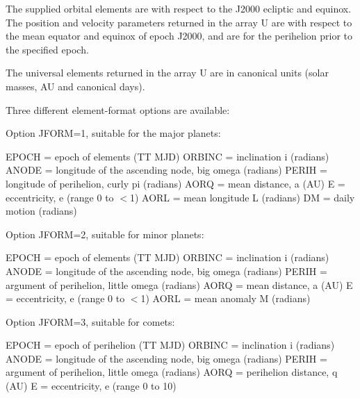 \documentclass[twoside,11pt,nolof]{starlink}
\begin{document}
{{{         \sstitem
          The supplied orbital elements are with respect to the J2000
           ecliptic and equinox.  The position and velocity parameters
           returned in the array U are with respect to the mean equator and
           equinox of epoch J2000, and are for the perihelion prior to the
           specified epoch.

         \sstitem
          The universal elements returned in the array U are in canonical
           units (solar masses, AU and canonical days).

         \sstitem
          Three different element-format options are available:

      }
        Option JFORM=1, suitable for the major planets:

        EPOCH  = epoch of elements (TT MJD)
        ORBINC = inclination i (radians)
        ANODE  = longitude of the ascending node, big omega (radians)
        PERIH  = longitude of perihelion, curly pi (radians)
        AORQ   = mean distance, a (AU)
        E      = eccentricity, e (range 0 to $<$1)
        AORL   = mean longitude L (radians)
        DM     = daily motion (radians)

        Option JFORM=2, suitable for minor planets:

        EPOCH  = epoch of elements (TT MJD)
        ORBINC = inclination i (radians)
        ANODE  = longitude of the ascending node, big omega (radians)
        PERIH  = argument of perihelion, little omega (radians)
        AORQ   = mean distance, a (AU)
        E      = eccentricity, e (range 0 to $<$1)
        AORL   = mean anomaly M (radians)

        Option JFORM=3, suitable for comets:

        EPOCH  = epoch of perihelion (TT MJD)
        ORBINC = inclination i (radians)
        ANODE  = longitude of the ascending node, big omega (radians)
        PERIH  = argument of perihelion, little omega (radians)
        AORQ   = perihelion distance, q (AU)
        E      = eccentricity, e (range 0 to 10)

   }
}
\end{document}
